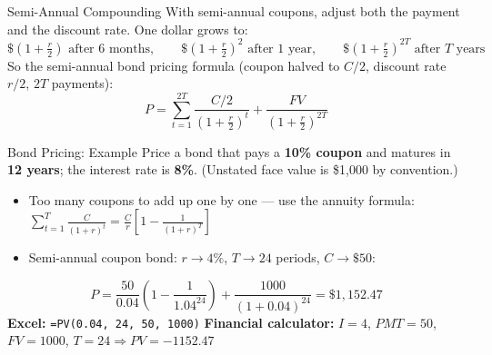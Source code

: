 \documentclass[aspectratio=169]{beamer}
\begin{document}
\begin{frame}{Semi-Annual Compounding}
With semi-annual coupons, adjust both the payment and the discount rate. One dollar grows to:
\[
\$\left(1+\tfrac{r}{2}\right) \text{ after 6 months},\qquad
\$\left(1+\tfrac{r}{2}\right)^{2} \text{ after 1 year},\qquad
\$\left(1+\tfrac{r}{2}\right)^{2T} \text{ after } T \text{ years}
\]
\vspace{0.2em}
So the semi-annual bond pricing formula (coupon halved to $C/2$, discount rate $r/2$, $2T$ payments):
\[
P = \sum_{t=1}^{2T} \frac{C/2}{\left(1+\frac{r}{2}\right)^{t}} + \frac{FV}{\left(1+\frac{r}{2}\right)^{2T}}
\]
\end{frame}

\begin{frame}{Bond Pricing: Example}
Price a bond that pays a \textbf{10\% coupon} and matures in \textbf{12 years}; the interest rate is \textbf{8\%}. (Unstated face value is \$1{,}000 by convention.)
\begin{itemize}
  \item Too many coupons to add up one by one --- use the annuity formula:
  $\displaystyle\sum_{t=1}^{T}\frac{C}{(1+r)^t} = \frac{C}{r}\left[1-\frac{1}{(1+r)^T}\right]$
  \item Semi-annual coupon bond: $r \to 4\%$, $T \to 24$ periods, $C \to \$50$:
\end{itemize}
\[
P = \frac{50}{0.04}\left(1-\frac{1}{1.04^{24}}\right) + \frac{1000}{(1+0.04)^{24}} = \$1{,}152.47
\]
\vspace{0.3em}
\textbf{Excel:} \texttt{=PV(0.04, 24, 50, 1000)} \quad \textbf{Financial calculator:} $I=4$, $PMT=50$, $FV=1000$, $T=24 \Rightarrow PV = -1152.47$
\end{frame}
\end{document}

